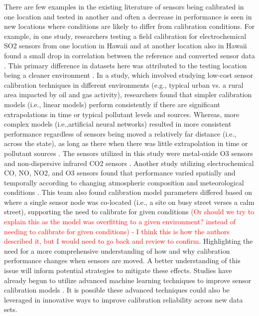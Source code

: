 \documentclass[journal abbreviation, manuscript]{copernicus}
\newcommand\todo[1]{\textcolor{red}{#1}}
\begin{document}
There are few examples in the existing literature of sensors being calibrated in one location and tested in another and often a decrease in performance is seen in new locations where conditions are likely to differ from calibration conditions.  For example, in one study, researchers testing a field calibration for electrochemical SO2 sensors from one location in Hawaii and at another location also in Hawaii found a small drop in correlation between the reference and converted sensor data \citep{Hagan2018}. This primary difference in datasets here was attributed to the testing location being a cleaner environment \citep{Hagan2018}. In a study, which involved studying low-cost sensor calibration techniques in different environments (e.g., typical urban vs. a rural area impacted by oil and gas activity), researchers found that simpler calibration models (i.e., linear models) perform consistently if there are significant extrapolations in time or typical pollutant levels and sources. Whereas, more complex models (i.e.,artificial neural networks) resulted in more consistent performance regardless of sensors being moved a relatively far distance (i.e., across the state), as long as there when there was little extrapolation in time or pollutant sources \citep{Casey2018testing}. The sensors utilized in this study were metal-oxide O3 sensors and non-dispersive infrared CO2 sensors \citep{Casey2018testing}. Another study utilizing electrochemical CO, NO, NO2, and O3 sensors found that performance varied spatially and temporally according to changing atmospheric composition and meteorological conditions \citep{Castell2017}. This team also found calibration model parameters differed based on where a single sensor node was co-located (i.e., a site on busy street verses a calm street), supporting the need to calibrate for given conditions \citep{Castell2017} \todo{(Or should we try to explain this as the model was overfitting to a given environment? instead of needing to calibrate for given conditions) - I think this is how the authors described it, but I would need to go back and review to confirm}. Highlighting the need for a more comprehensive understanding of how and why calibration performance changes when sensors are moved. A better understanding of this issue will inform potential strategies to mitigate these effects. Studies have already begun to utilize advanced machine learning techniques to improve sensor calibration models \citep{Zimmerman2018, DeVito2009, Casey2018Performance}. It is possible these advanced techniques could also be leveraged in innovative ways to improve calibration reliability across new data sets.
\end{document}
